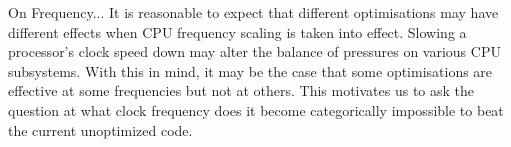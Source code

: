 

On Frequency...
It is reasonable to expect that different optimisations may have different effects when CPU frequency scaling is taken into effect. Slowing a processor's clock speed down may alter the balance of pressures on various CPU subsystems. With this in mind, it may be the case that some optimisations are effective at some frequencies but not at others. This motivates us to ask the question at what clock frequency does it become categorically impossible to beat the current unoptimized code.
